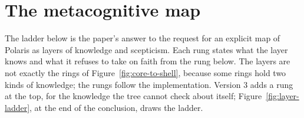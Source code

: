 \section{The metacognitive map}
\label{app:layers}

The ladder below is the paper's answer to the request for an explicit map of Polaris as layers of
knowledge and scepticism. Each rung states what the layer knows and what it refuses to take on faith
from the rung below. The layers are not exactly the rings of Figure~\ref{fig:core-to-shell}, because
some rings hold two kinds of knowledge; the rungs follow the implementation. Version 3 adds a rung at
the top, for the knowledge the tree cannot check about itself; Figure~\ref{fig:layer-ladder}, at the
end of the conclusion, draws the ladder.

